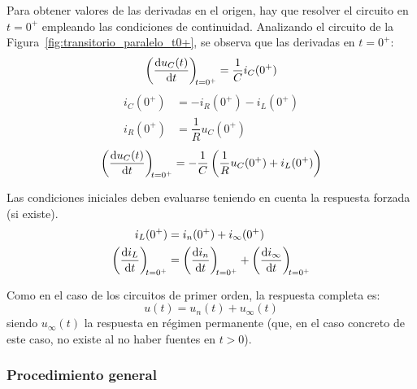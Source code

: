 Para obtener valores de las derivadas en el origen, hay que resolver
el circuito en \(t = 0^+\) empleando las condiciones de
continuidad. Analizando el circuito de la
Figura~\ref{fig:transitorio_paralelo_t0+}, se observa que las
derivadas en $t=0^+$:
\[
  \diff{u_C(t)}{t}[t = 0^+] = \frac{1}{C} i_C(0^+)
\]
\begin{align*}
  i_C(0^+) &= -i_R(0^+) - i_L(0^+)\\
  i_R(0^+) &= \dfrac{1}{R} u_C(0^+)
\end{align*}
\[ {\diff{u_C(t)}{t}[t = 0^+] = - \frac{1}{C}\left(\frac{1}{R}
      u_C(0^+) + i_L(0^+)\right)}
\]
\begin{remark}
  Las condiciones iniciales deben evaluarse teniendo en cuenta la
  respuesta forzada (si existe).
  \begin{align*}
    i_L(0^+) &= i_n(0^+) + i_{\infty}(0^+)\\
    \diff{i_L}{t}[t = 0^+] &= \diff{i_n}{t}[t = 0^+] + \diff{i_{\infty}}{t}[t = 0^+]  
  \end{align*}
\end{remark}
Como en el caso de los circuitos de primer orden, la respuesta
completa es:
\begin{equation*}
  u(t)=u_n(t)+u_\infty(t)
\end{equation*}
siendo $u_\infty(t)$ la respuesta en régimen permanente (que, en el
caso concreto de este caso, no existe al no haber fuentes en $t>0$).
	
\subsubsection{Procedimiento general}
	
